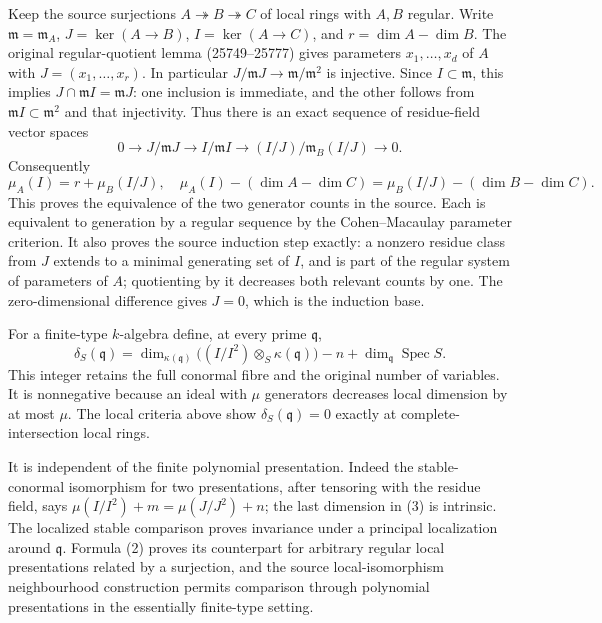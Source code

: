 Keep the source surjections \(A\twoheadrightarrow B\twoheadrightarrow C\) of local rings with \(A,B\) regular. Write \(\mathfrak m=\mathfrak m_A\), \(J=\ker(A\to B)\), \(I=\ker(A\to C)\), and \(r=\dim A-\dim B\). The original regular-quotient lemma (25749--25777) gives parameters \(x_1,\ldots,x_d\) of \(A\) with \(J=(x_1,\ldots,x_r)\). In particular \(J/\mathfrak mJ\to\mathfrak m/\mathfrak m^2\) is injective. Since \(I\subset\mathfrak m\), this implies \(J\cap\mathfrak mI=\mathfrak mJ\): one inclusion is immediate, and the other follows from \(\mathfrak mI\subset\mathfrak m^2\) and that injectivity. Thus there is an exact sequence of residue-field vector spaces \[
0\to J/\mathfrak mJ\to I/\mathfrak mI
\to (I/J)/\mathfrak m_B(I/J)\to0.
\tag{1}
\] Consequently \[
\mu_A(I)=r+\mu_B(I/J),\quad
\mu_A(I)-(\dim A-\dim C)
=\mu_B(I/J)-(\dim B-\dim C).\tag{2}
\] This proves the equivalence of the two generator counts in the source. Each is equivalent to generation by a regular sequence by the Cohen--Macaulay parameter criterion. It also proves the source induction step exactly: a nonzero residue class from \(J\) extends to a minimal generating set of \(I\), and is part of the regular system of parameters of \(A\); quotienting by it decreases both relevant counts by one. The zero-dimensional difference gives \(J=0\), which is the induction base.

For a finite-type \(k\)-algebra define, at every prime \(\mathfrak q\), \[
\delta_S(\mathfrak q)=
\dim_{\kappa(\mathfrak q)}\big((I/I^2)\otimes_S\kappa(\mathfrak q)\big)
-n+\dim_{\mathfrak q}\operatorname{Spec}S.\tag{3}
\] This integer retains the full conormal fibre and the original number of variables. It is nonnegative because an ideal with \(\mu\) generators decreases local dimension by at most \(\mu\). The local criteria above show \(\delta_S(\mathfrak q)=0\) exactly at complete-intersection local rings.

It is independent of the finite polynomial presentation. Indeed the stable-conormal isomorphism for two presentations, after tensoring with the residue field, says \(\mu(I/I^2)+m=\mu(J/J^2)+n\); the last dimension in (3) is intrinsic. The localized stable comparison proves invariance under a principal localization around \(\mathfrak q\). Formula (2) proves its counterpart for arbitrary regular local presentations related by a surjection, and the source local-isomorphism neighbourhood construction permits comparison through polynomial presentations in the essentially finite-type setting.

